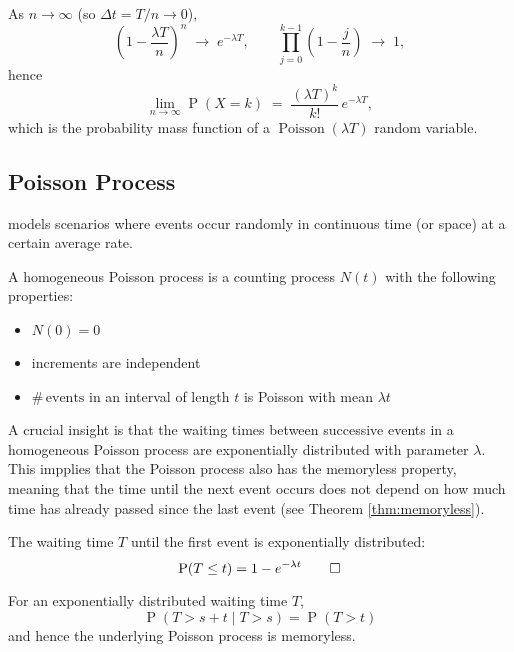 \documentclass[11pt, headings=standardclasses, parskip=half, twoside]{scrartcl}
\newcommand{\Prob}{\operatorname{P}}
\newcommand{\numof}{\ensuremath{\# \,}} %
\begin{document}
As \(n\to\infty\) (so \(\Delta t = T/n \to 0\)),
\[
\left(1-\frac{\lambda T}{n}\right)^{n}\;\longrightarrow\;e^{-\lambda T},
\qquad
\prod_{j=0}^{k-1}\left(1-\frac{j}{n}\right)\;\longrightarrow\;1,
\]
hence
\[
\lim_{n\to\infty}\Prob(X=k)\;=\;\frac{(\lambda T)^k}{k!}\,e^{-\lambda T},
\]
which is the probability mass function of a \(\operatorname{Poisson}(\lambda T)\) random variable. \qedhere
  

\subsection{Poisson Process}\label{subsec:poisson}
models scenarios where events occur randomly in continuous time (or space) at a certain average rate.

\begin{definition}\label{def:homogeneous_poisson}
  A homogeneous Poisson process is a counting process \(N(t)\) with the following properties:
  \begin{itemize}[before={\parskip = 0em}, nosep]
    \item \(N(0) = 0\)
    \item increments are independent
    \item \(\numof \text{events}\) in an interval of length \(t\) is Poisson with mean \(\lambda t\) \qedhere
  \end{itemize}
\end{definition}

A crucial insight is that the waiting times between successive events in a homogeneous Poisson process are exponentially distributed with parameter \(\lambda\).
This impplies that the Poisson process also has the memoryless property, meaning that the time until the next event occurs does not depend on how much time has already passed since the last event (see Theorem \ref{thm:memoryless}).

\begin{theorem}\label{thm:exp_waiting_times}
  The waiting time \(T\) until the first event is exponentially distributed:
  \[
  \Prob(T \leq t) = 1 - e^{-\lambda t} \qedhere
  \]
\end{theorem}

\begin{theorem}\label{thm:memoryless}
  For an exponentially distributed waiting time \(T\),
  \[
  \Prob(T > s + t \mid T > s) = \Prob(T > t)
  \]
  and hence the underlying Poisson process is memoryless.
\end{theorem}
\end{document}
